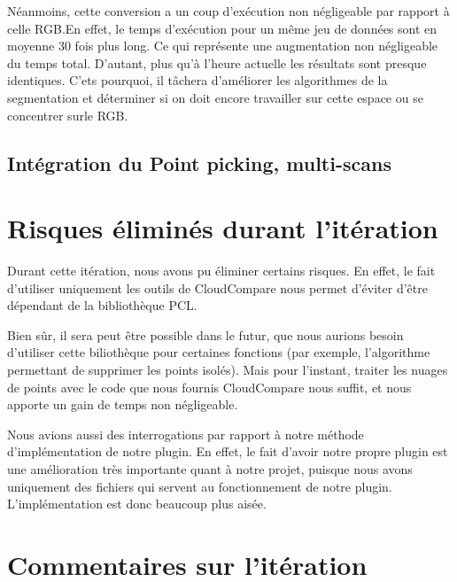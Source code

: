\documentclass[12pt,titlepage,french]{article}
\begin{document}
Néanmoins, cette conversion a un coup d'exécution non négligeable par rapport à celle RGB.En effet, le temps d'exécution pour un même jeu de données sont en moyenne 30 fois plus long. Ce qui représente une augmentation non négligeable du temps total. D'autant, plus qu'à l'heure actuelle les résultats sont presque identiques. C'ets pourquoi, il tâchera d'améliorer les algorithmes de la segmentation et déterminer si on doit encore travailler sur cette espace ou se concentrer surle RGB.

\subsection{Intégration du Point picking, multi-scans}



\section{Risques éliminés durant l'itération}
Durant cette itération, nous avons pu éliminer certains risques. En effet, le fait d'utiliser uniquement les outils de CloudCompare nous permet d'éviter d'être dépendant de la bibliothèque PCL. \newline

Bien sûr, il sera peut être possible dans le futur, que nous aurions besoin d'utiliser cette biliothèque pour certaines fonctions (par exemple, l'algorithme permettant de supprimer les points isolés). Mais pour l'instant, traiter les nuages de points avec le code que nous fournis CloudCompare nous suffit, et nous apporte un gain de temps non négligeable. \newline

Nous avions aussi des interrogations par rapport à notre méthode d'implémentation de notre plugin. En effet, le fait d'avoir notre propre plugin est une amélioration très importante quant à notre projet, puisque nous avons uniquement des fichiers qui servent au fonctionnement de notre plugin. L'implémentation est donc beaucoup plus aisée.

\section{Commentaires sur l'itération}
\end{document}
